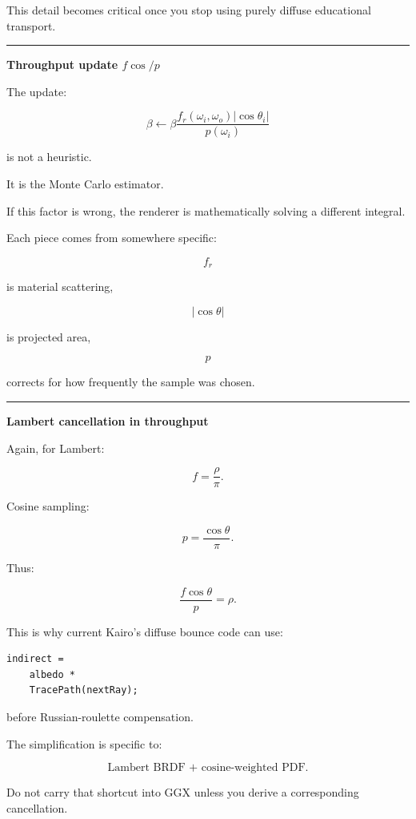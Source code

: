 This detail becomes critical once you stop using purely diffuse educational transport.

\begin{center}\rule{0.5\linewidth}{0.5pt}\end{center}

\textbf{Throughput update \(f\cos/p\)}

The update:

\[
\boxed{
\beta
\leftarrow
\beta
\frac{
f_r(\omega_i,\omega_o)
|\cos\theta_i|
}{
p(\omega_i)
}
}
\]

is not a heuristic.

It is the Monte Carlo estimator.

If this factor is wrong, the renderer is mathematically solving a different integral.

Each piece comes from somewhere specific:

\[
f_r
\]

is material scattering,

\[
|\cos\theta|
\]

is projected area,

\[
p
\]

corrects for how frequently the sample was chosen.

\begin{center}\rule{0.5\linewidth}{0.5pt}\end{center}

\textbf{Lambert cancellation in throughput}

Again, for Lambert:

\[
f=\frac{\rho}{\pi}.
\]

Cosine sampling:

\[
p=\frac{\cos\theta}{\pi}.
\]

Thus:

\[
\frac{f\cos\theta}{p}
=
\rho.
\]

This is why current Kairo's diffuse bounce code can use:

\begin{verbatim}
indirect =
    albedo *
    TracePath(nextRay);
\end{verbatim}

before Russian-roulette compensation.

The simplification is specific to:

\[
\boxed{
\text{Lambert BRDF + cosine-weighted PDF}.
}
\]

Do not carry that shortcut into GGX unless you derive a corresponding cancellation.

